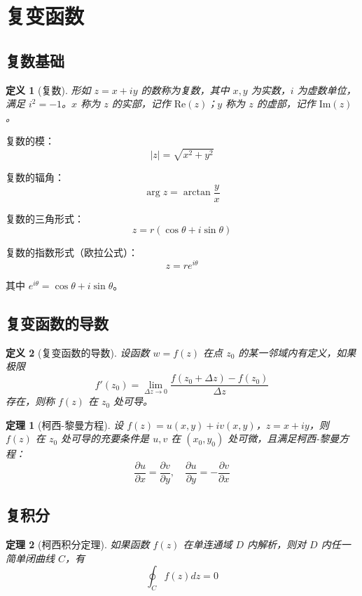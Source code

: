 \documentclass[12pt]{article}
\newtheorem{theorem}{定理}
\newtheorem{definition}{定义}
\begin{document}
\section{复变函数}

\subsection{复数基础}

\begin{definition}[复数]
形如 $z = x + iy$ 的数称为复数，其中 $x, y$ 为实数，$i$ 为虚数单位，满足 $i^2 = -1$。$x$ 称为 $z$ 的实部，记作 $\text{Re}(z)$；$y$ 称为 $z$ 的虚部，记作 $\text{Im}(z)$。
\end{definition}

复数的模：
$$|z| = \sqrt{x^2 + y^2}$$

复数的辐角：
$$\arg z = \arctan \frac{y}{x}$$

复数的三角形式：
$$z = r(\cos\theta + i\sin\theta)$$

复数的指数形式（欧拉公式）：
$$z = re^{i\theta}$$

其中 $e^{i\theta} = \cos\theta + i\sin\theta$。

\subsection{复变函数的导数}

\begin{definition}[复变函数的导数]
设函数 $w = f(z)$ 在点 $z_0$ 的某一邻域内有定义，如果极限
$$f'(z_0) = \lim_{\Delta z \to 0} \frac{f(z_0 + \Delta z) - f(z_0)}{\Delta z}$$
存在，则称 $f(z)$ 在 $z_0$ 处可导。
\end{definition}

\begin{theorem}[柯西-黎曼方程]
设 $f(z) = u(x, y) + iv(x, y)$，$z = x + iy$，则 $f(z)$ 在 $z_0$ 处可导的充要条件是 $u, v$ 在 $(x_0, y_0)$ 处可微，且满足柯西-黎曼方程：
$$\frac{\partial u}{\partial x} = \frac{\partial v}{\partial y}, \quad \frac{\partial u}{\partial y} = -\frac{\partial v}{\partial x}$$
\end{theorem}

\subsection{复积分}

\begin{theorem}[柯西积分定理]
如果函数 $f(z)$ 在单连通域 $D$ 内解析，则对 $D$ 内任一简单闭曲线 $C$，有
$$\oint_C f(z) dz = 0$$
\end{theorem}
\end{document}
